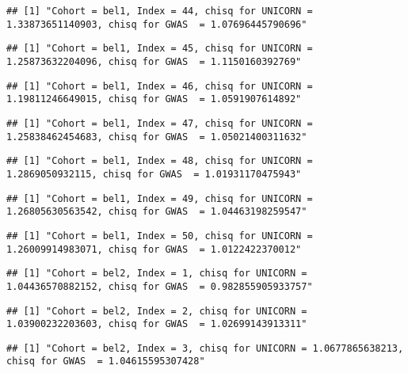 \documentclass[]{article}
\begin{document}
\begin{verbatim}
## [1] "Cohort = bel1, Index = 44, chisq for UNICORN = 1.33873651140903, chisq for GWAS  = 1.07696445790696"
\end{verbatim}

\begin{verbatim}
## [1] "Cohort = bel1, Index = 45, chisq for UNICORN = 1.25873632204096, chisq for GWAS  = 1.1150160392769"
\end{verbatim}

\begin{verbatim}
## [1] "Cohort = bel1, Index = 46, chisq for UNICORN = 1.19811246649015, chisq for GWAS  = 1.0591907614892"
\end{verbatim}

\begin{verbatim}
## [1] "Cohort = bel1, Index = 47, chisq for UNICORN = 1.25838462454683, chisq for GWAS  = 1.05021400311632"
\end{verbatim}

\begin{verbatim}
## [1] "Cohort = bel1, Index = 48, chisq for UNICORN = 1.2869050932115, chisq for GWAS  = 1.01931170475943"
\end{verbatim}

\begin{verbatim}
## [1] "Cohort = bel1, Index = 49, chisq for UNICORN = 1.26805630563542, chisq for GWAS  = 1.04463198259547"
\end{verbatim}

\begin{verbatim}
## [1] "Cohort = bel1, Index = 50, chisq for UNICORN = 1.26009914983071, chisq for GWAS  = 1.0122422370012"
\end{verbatim}

\begin{verbatim}
## [1] "Cohort = bel2, Index = 1, chisq for UNICORN = 1.04436570882152, chisq for GWAS  = 0.982855905933757"
\end{verbatim}

\begin{verbatim}
## [1] "Cohort = bel2, Index = 2, chisq for UNICORN = 1.03900232203603, chisq for GWAS  = 1.02699143913311"
\end{verbatim}

\begin{verbatim}
## [1] "Cohort = bel2, Index = 3, chisq for UNICORN = 1.0677865638213, chisq for GWAS  = 1.04615595307428"
\end{verbatim}
\end{document}
